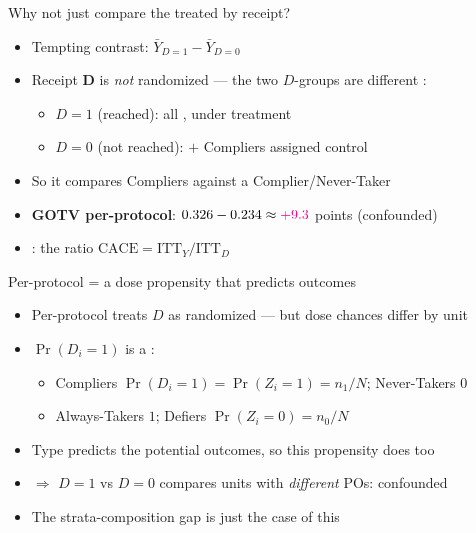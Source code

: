 \documentclass[table, xcolor = {dvipsnames}, 9pt]{beamer}
\theoremstyle{plain}
\newcommand{\mh}[1]{{\color{magenta}{#1}}}
\newcommand{\ITTY}{\mathrm{ITT}_Y}
\newcommand{\ITTD}{\mathrm{ITT}_D}
\newcommand{\CACE}{\mathrm{CACE}}
\begin{document}
\begin{frame}[t]{Why not just compare the treated by receipt?}
\vfill
\begin{itemize} \vfill
\item Tempting \mh{per-protocol} contrast: $\bar{Y}_{D = 1} - \bar{Y}_{D = 0}$ \vfill
\item Receipt $\bm{D}$ is \emph{not} randomized --- the two $D$-groups are different \mh{types}: \vfill
\begin{itemize} \vfill
\item $D = 1$ (reached): all \mh{Compliers}, under treatment \vfill
\item $D = 0$ (not reached): \mh{Never-Takers} $+$ Compliers assigned control \vfill
\end{itemize} \vfill
\item So it compares Compliers against a Complier/Never-Taker \mh{mix} \vfill
\item \textbf{GOTV per-protocol}: $0.326 - 0.234 \approx \mh{+9.3}$ points (confounded) \vfill
\item \mh{Analyze as you randomized}: the ratio $\CACE = \ITTY/\ITTD$ \vfill
\end{itemize} \vfill
\end{frame}
\begin{frame}[t]{Per-protocol = a dose propensity that predicts outcomes}
\vfill
\begin{itemize} \vfill
\item Per-protocol treats $D$ as randomized --- but dose chances differ by unit \vfill
\item $\Pr(D_i = 1)$ is a \mh{type-dependent propensity}: \vfill
\begin{itemize} \vfill
\item Compliers $\Pr(D_i = 1) = \Pr(Z_i = 1) = n_1/N$; \; Never-Takers $0$ \vfill
\item Always-Takers $1$; \; Defiers $\Pr(Z_i = 0) = n_0/N$ \vfill
\end{itemize} \vfill
\item Type predicts the potential outcomes, so this propensity does too \vfill
\item[] $\Rightarrow$ $D = 1$ vs $D = 0$ compares units with \emph{different} POs: confounded \vfill
\item The strata-composition gap is just the \mh{degenerate} case of this \vfill
\end{itemize} \vfill
\end{frame}
\end{document}
